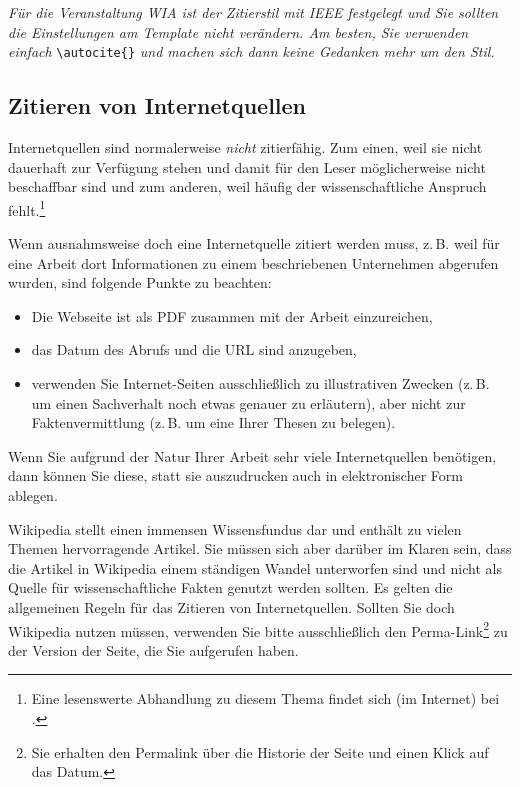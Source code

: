 \documentclass[conference,compsoc,final,a4paper]{IEEEtran}
\begin{document}
    \textit{Für die Veranstaltung WIA ist der Zitierstil mit IEEE festgelegt und Sie sollten die Einstellungen am Template nicht verändern. Am besten, Sie verwenden einfach}  \verb+\autocite{}+ \textit{und machen sich dann keine Gedanken mehr um den Stil.}

    \subsection{Zitieren von Internetquellen}
    Internetquellen sind normalerweise \textit{nicht} zitierfähig. Zum einen, weil sie nicht dauerhaft zur Verfügung stehen und damit für den Leser möglicherweise nicht beschaffbar sind und zum anderen, weil häufig der wissenschaftliche Anspruch fehlt.\footnote{Eine lesenswerte Abhandlung zu diesem Thema findet sich (im Internet) bei \autocite{Weber2006}.}

    Wenn ausnahmsweise doch eine Internetquelle zitiert werden muss, z.\,B. weil für eine Arbeit dort Informationen zu einem beschriebenen Unternehmen abgerufen wurden, sind folgende Punkte zu beachten:

    \begin{itemize}
        \item Die Webseite ist als PDF zusammen mit der Arbeit einzureichen,
        \item das Datum des Abrufs und die URL sind anzugeben,
        \item verwenden Sie Internet-Seiten ausschließlich zu illustrativen Zwecken (z.\,B. um einen Sachverhalt noch etwas genauer zu erläutern), aber nicht zur Faktenvermittlung (z.\,B. um eine Ihrer Thesen zu belegen).
    \end{itemize}

    Wenn Sie aufgrund der Natur Ihrer Arbeit sehr viele Internetquellen benötigen, dann können Sie diese, statt sie auszudrucken auch in elektronischer Form ablegen.

    Wikipedia stellt einen immensen Wissensfundus dar und enthält zu vielen Themen hervorragende Artikel. Sie müssen sich aber darüber im Klaren sein, dass die Artikel in Wikipedia einem ständigen Wandel unterworfen sind und nicht als Quelle für wissenschaftliche Fakten genutzt werden sollten. Es gelten die allgemeinen Regeln für das Zitieren von Internetquellen. Sollten Sie doch Wikipedia nutzen müssen, verwenden Sie bitte ausschließlich den Perma-Link\footnote{Sie erhalten den Permalink über die Historie der Seite und einen Klick auf das Datum.} zu der Version der Seite, die Sie aufgerufen haben.
\end{document}
